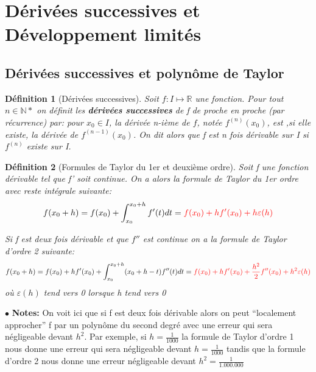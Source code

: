 \documentclass[a4paper]{article}
\theoremstyle{break}
\newtheorem{mydef}{Définition}[section]
\newcommand{\R}{\mathbb{R}}
\newcommand{\note}{$\bullet$ \textbf{Notes: }}
\begin{document}
\section{Dérivées successives et Développement limités}

\subsection{Dérivées successives et polynôme de Taylor}
\begin{mydef}[Dérivées successives]
  Soit $f: I \mapsto \R$ une fonction. Pour tout $n \in \mathbb{N}*$ on définit
  les \textbf{dérivées successives} de f de proche en proche (par récurrence)
  par: pour $x_0 \in I$, la dérivée n-ième de $f$, notée $f^{(n)}(x_0)$, est
  ,si elle existe, la dérivée de $f^{(n-1)}(x_0)$. On dit alors que f est n fois
  dérivable sur I si $f^{(n)}$ existe sur I. 
\end{mydef}

\begin{mydef}[Formules de Taylor du 1er et deuxième ordre]
  Soit f une fonction dérivable tel que f' soit continue. On a alors la formule
  de Taylor du 1er ordre avec reste intégrale suivante:
  \[
    f(x_0+h) = f(x_0) + \int_{x_0}^{x_0+h} f'(t) dt = \color{red}{f(x_0) + hf'(x_0) +
    h\varepsilon(h) }
  \]

  Si f est deux fois dérivable et que $f''$ est continue on a la formule de
  Taylor d'ordre 2 suivante:
  \[
    f(x_0+h) = f(x_0) + hf'(x_0) + \int_{x_0}^{x_0+h} (x_0+h-t) f''(t) dt = \color{red}{f(x_0)
    + hf'(x_0) + \frac{h^2}{2} f''(x_0)+ h^2 \varepsilon(h) }
  \]
  où $\varepsilon(h)$ tend vers 0 lorsque h tend vers 0
\end{mydef}

\note On voit ici que si f est deux fois dérivable alors on peut ``localement
approcher'' f par un polynôme du second degré avec une erreur qui sera
négligeable devant $h^2$. Par exemple, si $h=\frac{1}{1000}$ la formule de
Taylor d'ordre 1 nous donne une erreur qui sera négligeable devant $h
=\frac{1}{1000}$ tandis que la formule d'ordre 2 nous donne une erreur
négligeable devant $h^2 = \frac{1}{1.000.000}$
\end{document}
